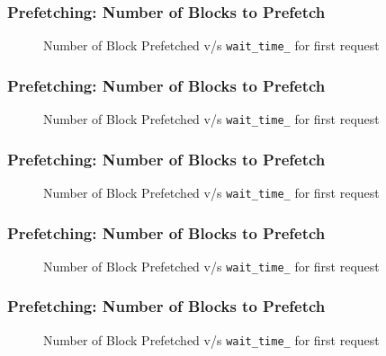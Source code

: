 \documentclass{beamer}
\begin{document}
\begin{frame}\frametitle{Prefetching: Number of Blocks to Prefetch}
  \begin{figure}[h]
    \resizebox{.9\linewidth}{!}{}
    \caption{Number of Block Prefetched v/s \texttt{wait\_time\_} for first request}
  \end{figure}
\end{frame}

\begin{frame}\frametitle{Prefetching: Number of Blocks to Prefetch}
  \begin{figure}[h]
    \resizebox{.9\linewidth}{!}{}
    \caption{Number of Block Prefetched v/s \texttt{wait\_time\_} for first request}
  \end{figure}
\end{frame}

\begin{frame}\frametitle{Prefetching: Number of Blocks to Prefetch}
  \begin{figure}[h]
    \resizebox{.9\linewidth}{!}{}
    \caption{Number of Block Prefetched v/s \texttt{wait\_time\_} for first request}
  \end{figure}
\end{frame}

\begin{frame}\frametitle{Prefetching: Number of Blocks to Prefetch}
  \begin{figure}[h]
    \resizebox{.9\linewidth}{!}{}
    \caption{Number of Block Prefetched v/s \texttt{wait\_time\_} for first request}
  \end{figure}
\end{frame}

\begin{frame}\frametitle{Prefetching: Number of Blocks to Prefetch}
  \begin{figure}[h]
    \resizebox{.9\linewidth}{!}{}
    \caption{Number of Block Prefetched v/s \texttt{wait\_time\_} for first request}
  \end{figure}
\end{frame}
\end{document}
